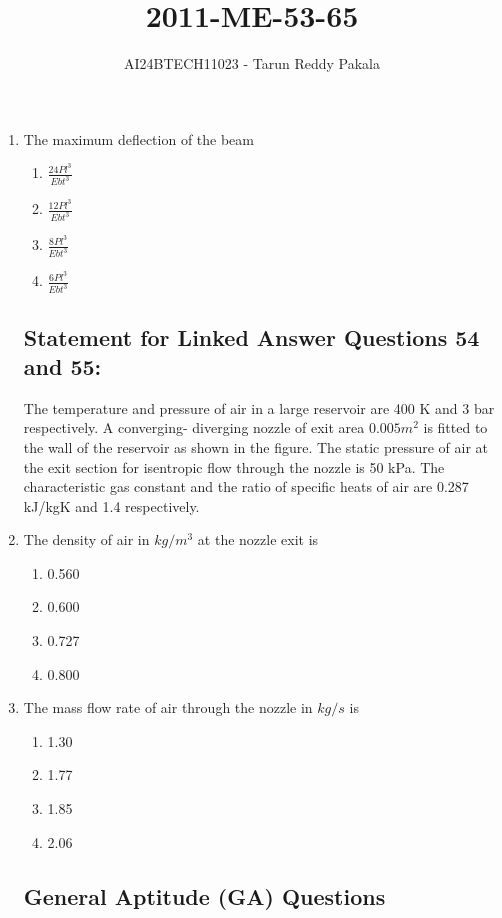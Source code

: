 \documentclass[journal,12pt,onecolumn]{IEEEtran}
\title{2011-ME-53-65}
\author{AI24BTECH11023 - Tarun Reddy Pakala}
\theoremstyle{remark}
\begin{document}


\maketitle
\bigskip
\renewcommand{\thefigure}{\theenumi}
\renewcommand{\thetable}{\theenumi}
\begin{enumerate} [start=53]
\item The maximum deflection of the beam
\begin{enumerate}
    \item $\frac{24Pl^3}{Ebt^3}$
    \item $\frac{12Pl^3}{Ebt^3}$
    \item $\frac{8Pl^3}{Ebt^3}$
    \item $\frac{6Pl^3}{Ebt^3}$
\end{enumerate}
\subsection*{\textbf{Statement for Linked Answer Questions 54 and 55:}}
The temperature and pressure of air in a large reservoir are 400 K and 3 bar respectively. A converging- diverging nozzle of exit area $0.005 m^2$ is fitted to the wall of the reservoir as shown in the figure. The static pressure of air at the exit section for isentropic flow through the nozzle is 50 kPa. The characteristic gas constant and the ratio of specific heats of air are 0.287 kJ/kgK and 1.4 respectively.
		
\item The density of air in $kg/m^3$ at the nozzle exit is 
\begin{enumerate}
    \item 0.560
    \item 0.600
    \item 0.727
    \item 0.800
\end{enumerate}
\item The mass flow rate of air through the nozzle in $kg/s$ is
\begin{enumerate}
    \item 1.30
    \item 1.77
    \item 1.85
    \item 2.06
\end{enumerate}
\subsection*{\textbf{General Aptitude (GA) Questions}}

\end{enumerate}
\end{document}
